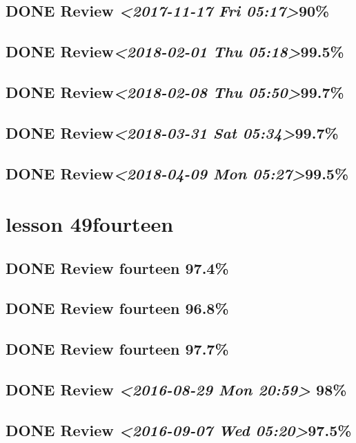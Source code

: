 \documentclass[11pt]{ctexart}
\begin{document}
\subsection{{\bfseries\sffamily DONE} Review \textit{<2017-11-17 Fri 05:17>}90\%}
\label{sec:org47ce51a}
\subsection{{\bfseries\sffamily DONE} Review\textit{<2018-02-01 Thu 05:18>}99.5\%}
\label{sec:orgbf228a1}
\subsection{{\bfseries\sffamily DONE} Review\textit{<2018-02-08 Thu 05:50>}99.7\%}
\label{sec:org1502005}
\subsection{{\bfseries\sffamily DONE} Review\textit{<2018-03-31 Sat 05:34>}99.7\%}
\label{sec:orgb2ab25c}
\subsection{{\bfseries\sffamily DONE} Review\textit{<2018-04-09 Mon 05:27>}99.5\%}
\label{sec:org7e353c5}
\section{lesson 49fourteen}
\label{sec:org6124098}
\subsection{{\bfseries\sffamily DONE} Review fourteen 97.4\%}
\label{sec:org3fe45de}
\subsection{{\bfseries\sffamily DONE} Review fourteen 96.8\%}
\label{sec:orga107257}
\subsection{{\bfseries\sffamily DONE} Review fourteen 97.7\%}
\label{sec:org75d0500}
\subsection{{\bfseries\sffamily DONE} Review \textit{<2016-08-29 Mon 20:59> } 98\%}
\label{sec:org14cfd9f}
\subsection{{\bfseries\sffamily DONE} Review \textit{<2016-09-07 Wed 05:20>}97.5\%}
\label{sec:orgcd71f3d}
\end{document}
